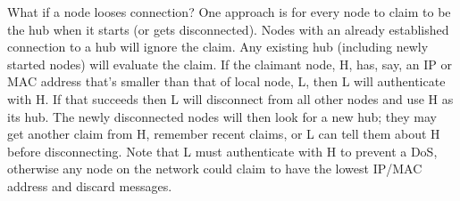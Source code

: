 
What if a node looses connection? One approach is for every node to claim to 
be the hub when it starts (or gets disconnected). Nodes with an already 
established connection to a hub will ignore the claim. Any existing hub
(including newly started nodes) will evaluate the claim. If the claimant node,
H, has, say, an IP or MAC address that's smaller than that of local node, L,
then L will authenticate with H. If that succeeds then L will disconnect from 
all other nodes and use H as its hub. The newly disconnected nodes will then 
look for a new hub; they may get another claim from H, remember recent claims, 
or L can tell them about H before disconnecting. Note that L must authenticate 
with H to prevent a DoS, otherwise any node on the network could claim to have 
the lowest IP/MAC address and discard messages.

